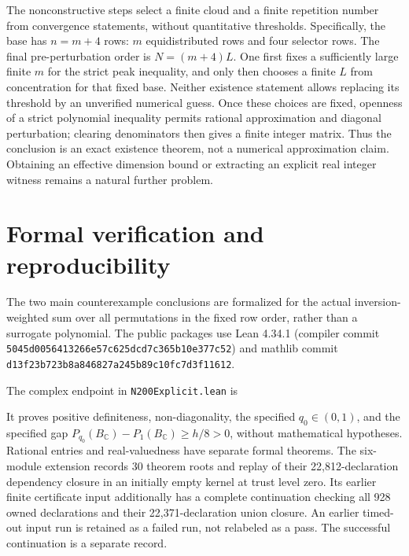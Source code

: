 \documentclass[11pt]{article}
\theoremstyle{remark}
\newcommand{\C}{\mathbb C}
\begin{document}
The nonconstructive steps select a finite cloud and a finite repetition
number from convergence statements, without quantitative thresholds.
Specifically, the base has $n=m+4$ rows: $m$ equidistributed rows and
four selector rows. The final pre-perturbation order is $N=(m+4)L$.
One first fixes a sufficiently large finite $m$ for the strict peak
inequality, and only then chooses a finite $L$ from concentration for
that fixed base. Neither existence statement allows replacing its
threshold by an unverified numerical guess.
Once these choices are fixed, openness of a strict polynomial inequality
permits rational approximation and diagonal perturbation; clearing
denominators then gives a finite integer matrix. Thus the conclusion
is an exact existence theorem, not a numerical approximation claim.
Obtaining an effective dimension bound or extracting an explicit real
integer witness remains a natural further problem.


\section{Formal verification and reproducibility}\label{sec:verification}
The two main counterexample conclusions are formalized for the
actual inversion-weighted sum over all permutations in the fixed row
order, rather than a surrogate polynomial. The public packages use
Lean 4.34.1 (compiler commit
\texttt{5045d0056413266e57c625dcd7c365b10e377c52}) and mathlib
commit \texttt{d13f23b723b8a846827a245b89c10fc7d3f11612}.

The complex endpoint in \texttt{N200Explicit.lean} is
\begin{quote}\small
{}
\end{quote}
It proves positive definiteness,
non-diagonality, the specified $q_0\in(0,1)$, and the specified gap
$P_{q_0}(B_{\C})-P_1(B_{\C})\ge h/8>0$, without mathematical
hypotheses. Rational entries and real-valuedness have separate
formal theorems. The six-module extension records 30 theorem roots
and replay of their 22,812-declaration dependency closure in an
initially empty kernel at trust level zero. Its earlier finite
certificate input additionally has a complete continuation checking
all 928 owned declarations and their 22,371-declaration union closure.
An earlier timed-out input run is retained as a failed run, not
relabeled as a pass. The successful continuation is a separate record.
\end{document}
